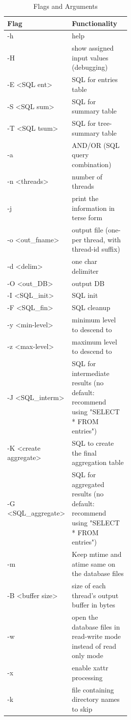 \begin{table} [H]
  \centering
  \begin{tabular*}{\linewidth}{l|p{0.5\linewidth}}
    Flag & Functionality \\
    \hline
    -h & help \\
    \hline
    -H & show assigned input values (debugging) \\
    \hline
    -E \textless SQL ent\textgreater & SQL for entries table \\
    \hline
    -S \textless SQL sum\textgreater & SQL for summary table \\
    \hline
    -T \textless SQL tsum\textgreater & SQL for tree-summary table \\
    \hline
    -a & AND/OR (SQL query combination) \\
    \hline
    -n \textless threads\textgreater & number of threads \\
    \hline
    -j & print the information in terse form \\
    \hline
    -o \textless out\_fname\textgreater & output file (one-per thread, with thread-id suffix) \\
    \hline
    -d \textless delim\textgreater & one char delimiter \\
    \hline
    -O \textless out\_DB\textgreater & output DB \\
    \hline
    -I \textless SQL\_init\textgreater & SQL init \\
    \hline
    -F \textless SQL\_fin\textgreater & SQL cleanup \\
    \hline
    -y \textless min-level\textgreater & minimum level to descend to \\
    \hline
    -z \textless max-level\textgreater & maximum level to descend to \\
    \hline
    -J \textless SQL\_interm\textgreater & SQL for intermediate results (no default: recommend using "SELECT * FROM entries") \\
    \hline
    -K \textless create aggregate\textgreater & SQL to create the final aggregation table \\
    \hline
    -G \textless SQL\_aggregate\textgreater & SQL for aggregated results (no default: recommend using "SELECT * FROM entries") \\
    \hline
    -m & Keep mtime and atime same on the database files \\
    \hline
    -B \textless buffer size\textgreater & size of each thread's output buffer in bytes \\
    \hline
    -w & open the database files in read-write mode instead of read only mode \\
    \hline
    -x & enable xattr processing \\
    \hline
    -k & file containing directory names to skip \\
    \hline
  \end{tabular*}
  \caption{\label{tab:widgets} \gufiquery Flags and Arguments}
\end{table}

